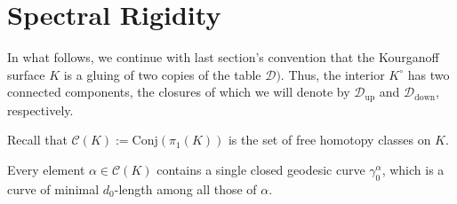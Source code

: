 \documentclass[reqno,11pt]{amsart}
\begin{document}
\section{Spectral Rigidity}\label{sec:spectral_rigidity}
In what follows, we continue with last section's convention that the Kourganoff surface \(K\) is a gluing of two copies of the table \(\mathcal{D})\).
Thus, the interior \( K^\circ \) has two connected components, the closures of which we will denote by \( \mathcal{D}_{\mathrm{up}} \) and \( \mathcal{D}_{\mathrm{down}} \), respectively.
\par Recall that \( \mathcal{C}(K) := \mathrm{Conj}(\pi_1(K)) \) is the set of free homotopy classes on \( K \).
\begin{lemma}\label{lem:unique_minimising_geodesic}
    Every element \( \alpha \in \mathcal{C}(K) \) contains a single closed geodesic curve \( \gamma^\alpha_0 \), which is a curve of minimal \(d_0\)-length among all those of \( \alpha \).
\end{lemma}
\end{document}

